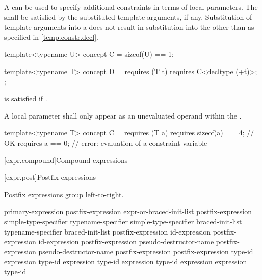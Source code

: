 \pnum
A  can be used
to specify additional constraints in terms of local parameters.
The 
shall be satisfied
by the substituted template arguments, if any.
Substitution of template arguments into a 
does not result in substitution into the 
other than as specified in \ref{temp.constr.decl}.
\begin{example}
\begin{codeblock}
template<typename U> concept C = sizeof(U) == 1;

template<typename T> concept D = requires (T t) {
  requires C<decltype (+t)>;
};
\end{codeblock}
 is satisfied if .
\end{example}

\pnum
A local parameter shall only appear as an unevaluated operand
within the .
\begin{example}
\begin{codeblock}
template<typename T> concept C = requires (T a) {
  requires sizeof(a) == 4;  // OK
  requires a == 0;          // error: evaluation of a constraint variable
}
\end{codeblock}
\end{example}

[expr.compound]{Compound expressions}

[expr.post]{Postfix expressions}%

\pnum
Postfix expressions group left-to-right.

\begin{bnf}
\br
    primary-expression\br
    postfix-expression \terminal{[} expr-or-braced-init-list \terminal{]}\br
    postfix-expression \terminal{(}  \terminal{)}\br
    simple-type-specifier \terminal{(}  \terminal{)}\br
    typename-specifier \terminal{(}  \terminal{)}\br
    simple-type-specifier braced-init-list\br
    typename-specifier braced-init-list\br
    postfix-expression  id-expression\br
    postfix-expression  id-expression\br
    postfix-expression  pseudo-destructor-name\br
    postfix-expression \terminal{->} pseudo-destructor-name\br
    postfix-expression \terminal{++}\br
    postfix-expression \terminal{-{-}}\br
     type-id \terminal{> (} expression \terminal{)}\br
     type-id \terminal{> (} expression \terminal{)}\br
     type-id \terminal{> (} expression \terminal{)}\br
     type-id \terminal{> (} expression \terminal{)}\br
     expression \terminal{)}\br
     type-id \terminal{)}
\end{bnf}


